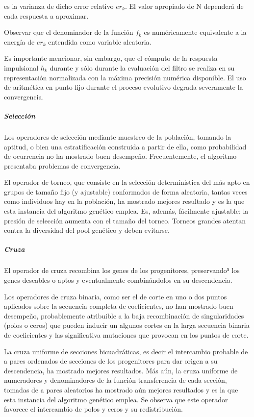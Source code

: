 \documentclass[11pt]{article}
\begin{document}
es la varianza de dicho error relativo \(er_k\). El valor apropiado de N
dependerá de cada respuesta a aproximar.

Observar que el denominador de la función \(f_k\) es numéricamente
equivalente a la energía de \(er_k\) entendida como variable aleatoria.

Es importante mencionar, sin embargo, que el cómputo de la respuesta
impulsional \(h_k\) durante y sólo durante la evaluación del filtro se
realiza en su representación normalizada con la máxima precisión
numérica disponible. El uso de aritmética en punto fijo durante el
proceso evolutivo degrada severamente la convergencia.

\subparagraph{Selección}\label{selecciuxf3n}

Los operadores de selección mediante muestreo de la población, tomando
la aptitud, o bien una estratificación construida a partir de ella, como
probabilidad de ocurrencia no ha mostrado buen desempeño.
Frecuentemente, el algoritmo presentaba problemas de convergencia.

El operador de torneo, que consiste en la selección determínistica del
más apto en grupos de tamaño fijo (y ajustable) conformados de forma
aleatoria, tantas veces como individuos hay en la población, ha mostrado
mejores resultado y es la que esta instancia del algoritmo genético
emplea. Es, además, fácilmente ajustable: la presión de selección
aumenta con el tamaño del torneo. Torneos grandes atentan contra la
diversidad del pool genético y deben evitarse.

\subparagraph{Cruza}\label{cruza}

El operador de cruza recombina los genes de los progenitores,
preservando⁵ los genes deseables o aptos y eventualmente combinándolos
en su descendencia.

Los operadores de cruza binaria, como ser el de corte en uno o dos
puntos aplicados sobre la secuencia completa de coeficientes, no han
mostrado buen desempeño, probablemente atribuible a la baja
recombinación de singularidades (polos o ceros) que pueden inducir un
algunos cortes en la larga secuencia binaria de coeficientes y las
significativa mutaciones que provocan en los puntos de corte.

La cruza uniforme de secciones bicuadráticas, es decir el intercambio
probable de a pares ordenados de secciones de los progenitores para dar
origen a su descendencia, ha mostrado mejores resultados. Más aún, la
cruza uniforme de numeradores y denominadores de la función
transferencia de cada sección, tomadas de a pares aleatorios ha mostrado
aún mejores resultados y es la que esta instancia del algoritmo genético
emplea. Se observa que este operador favorece el intercambio de polos y
ceros y su redistribución.
\end{document}
